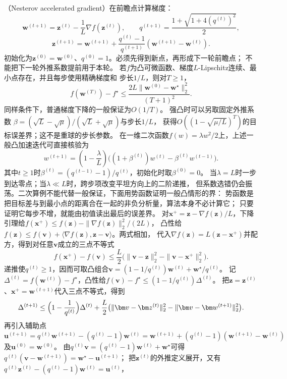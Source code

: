 （Nesterov accelerated gradient）在前瞻点计算梯度：
\[
 \bm w^{(t+1)}=\bm z^{(t)}-\frac1L\nabla f(\bm z^{(t)}),\qquad
 q^{(t+1)}=\frac{1+\sqrt{1+4(q^{(t)})^2}}2,
\]
\[
 \bm z^{(t+1)}=\bm w^{(t+1)}
 +\frac{q^{(t)}-1}{q^{(t+1)}}(\bm w^{(t+1)}-\bm w^{(t)}).
\]
初始化为$\bm z^{(0)}=\bm w^{(0)}$、$q^{(0)}=1$。必须先得到新点，再形成下一轮前瞻点；
不能把下一轮外推系数提前用于本轮。
若$f$为凸可微函数、梯度$L$-Lipschitz连续、最小点存在，并且每步使用精确梯度和
步长$1/L$，则对$T\geq1$，
\begin{equation}
 f(\bm w^{(T)})-f^\star
 \leq\frac{2L\|\bm w^{(0)}-\bm w^\star\|_2^2}{(T+1)^2}.
 \label{eq:opt-accelerated-finite-rate}
\end{equation}
同样条件下，普通梯度下降的一般保证为$O(1/T)$。
强凸时可以另取固定外推系数
$\beta=(\sqrt L-\sqrt\mu)/(\sqrt L+\sqrt\mu)$与步长$1/L$，
获得$O((1-\sqrt{\mu/L})^T)$的目标误差界；这不是重球的步长参数。
在一维二次函数$f(w)=\lambda w^2/2$上，上述一般凸加速迭代可直接核验为
\[
  w^{(t+1)}
  =\left(1-\frac{\lambda}{L}\right)
  \bigl((1+\beta^{(t)})w^{(t)}-\beta^{(t)} w^{(t-1)}\bigr).
\]
其中$t\geq1$时$\beta^{(t)}=(q^{(t-1)}-1)/q^{(t)}$，初始化时取$\beta^{(0)}=0$。
当$\lambda=L$时一步到达零点；当$\lambda\ll L$时，跨步项改变平坦方向上的二阶递推，
但系数选错仍会振荡。二次算例不能代替一般保证，下面用势函数证明一般凸情形的界：
势函数是把目标差与到最小点的距离合在一起的非负分析量，算法本身不必计算它；
只要证明它每步不增，就能由初值读出最后的误差界。
对$\bm x^+=\bm z-\nabla f(\bm z)/L$，下降引理给$f(\bm x^+)\leq f(\bm z)-\|\nabla f(\bm z)\|_2^2/(2L)$，
凸性给$f(\bm z)\leq f(\bm v)+\langle\nabla f(\bm z),\bm z-\bm v\rangle$。两式相加，
代入$\nabla f(\bm z)=L(\bm z-\bm x^+)$并配方，得到对任意$\bm v$成立的三点不等式
\[
 f(\bm x^+)-f(\bm v)
 \leq\frac L2\bigl(\|\bm v-\bm z\|_2^2-\|\bm v-\bm x^+\|_2^2\bigr).
\]
递推使$q^{(t)}\geq1$，因而可取凸组合$\bm v=(1-1/q^{(t)})\bm w^{(t)}+\bm w^\star/q^{(t)}$。
记$\Delta^{(t)}=f(\bm w^{(t)})-f^\star$，凸性给$f(\bm v)-f^\star\leq(1-1/q^{(t)})\Delta^{(t)}$。
把$\bm z=\bm z^{(t)}$、$\bm x^+=\bm w^{(t+1)}$代入三点不等式，得到
\[
 \Delta^{(t+1)}
 \leq\Bigl(1-\frac1{q^{(t)}}\Bigr)\Delta^{(t)}
 +\frac L2\bigl(\|\bm v-\bm z^{(t)}\|_2^2-\|\bm v-\bm w^{(t+1)}\|_2^2\bigr).
\]
再引入辅助点
$\bm u^{(t+1)}=q^{(t)}\bm w^{(t+1)}-(q^{(t)}-1)\bm w^{(t)}
=\bm w^{(t+1)}+(q^{(t)}-1)(\bm w^{(t+1)}-\bm w^{(t)})$及$\bm u^{(0)}=\bm w^{(0)}$。
由$q^{(t)}\bm v=(q^{(t)}-1)\bm w^{(t)}+\bm w^\star$可得
$q^{(t)}(\bm v-\bm w^{(t+1)})=\bm w^\star-\bm u^{(t+1)}$；
把$\bm z^{(t)}$的外推定义展开，又有$q^{(t)}\bm z^{(t)}-(q^{(t)}-1)\bm w^{(t)}=\bm u^{(t)}$，
